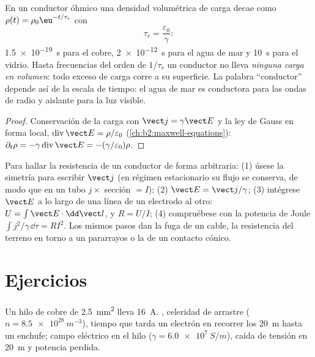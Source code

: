\begin{proposition}\label{prop:b2:charges-currents-conduction:relaxation}
En un conductor óhmico una densidad volumétrica de carga decae como $\rho(t) =
\rho_0\eu^{-t/\tau_r}$ con
\[
\tau_r = \frac{\varepsilon_0}{\gamma} :
\]
\qty{1.5e-19}{s} para el cobre, \qty{2e-12}{s} para el agua de mar y \qty{10}{s} para el vidrio.
Hasta frecuencias del orden de $1/\tau_r$ un conductor no lleva
\emph{ninguna carga en volumen}: todo exceso de carga corre a su
superficie. La palabra ``conductor'' depende así de la escala de tiempo: el
agua de mar es conductora para las ondas de radio y aislante para la luz visible.
\end{proposition}

\begin{proof}
Conservación de la carga con $\vect j = \gamma\vect E$ y la ley de Gauss en
forma local, $\operatorname{div}\vect E = \rho/\varepsilon_0$ (\cref{ch:b2:maxwell-equations}):
$\partial_t\rho = -\gamma\operatorname{div}\vect E = -(\gamma/\varepsilon_0)\rho$.
\end{proof}

\begin{method}\label{met:b2:charges-currents-conduction:method}
Para hallar la resistencia de un conductor de forma arbitraria: (1) úsese
la simetría para escribir $\vect j$ (en régimen estacionario su flujo se
conserva, de modo que en un tubo $j \times$ sección $= I$); (2) $\vect E = \vect j/\gamma$;
(3) intégrese $\vect E$ a lo largo de una línea de un electrodo al otro: $U = \int\vect E\cdot
\dd\vect l$, y $R = U/I$; (4) compruébese con la potencia de Joule $\int j^2/\gamma\,
\dd\tau = RI^2$. Los mismos pasos dan la fuga de un cable, la resistencia
del terreno en torno a un pararrayos o la de un contacto cónico.
\end{method}

\section{Ejercicios}

\begin{exercise}[$\star$]\label{exo:b2:charges-currents-conduction:1}
Un hilo de cobre de \qty{2.5}{mm^2} lleva \qty{16}{A}. ,
celeridad de arrastre ($n = \qty{8.5e28}{m^{-3}}$), tiempo que tarda un
electrón en recorrer los \qty{20}{m} hasta un enchufe; campo eléctrico en el hilo ($\gamma = \qty{6.0e7}{S/m}$),
caída de tensión en \qty{20}{m} y potencia perdida.
\end{exercise}

